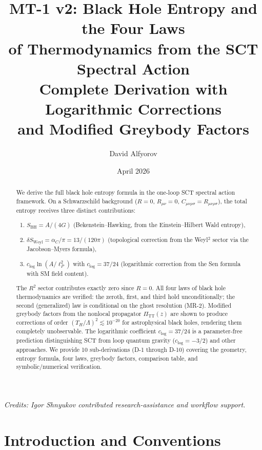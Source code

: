 \documentclass[11pt,a4paper]{article}
\title{MT-1 v2: Black Hole Entropy and the Four Laws\\
of Thermodynamics from the SCT Spectral Action\\[6pt]
\large Complete Derivation with Logarithmic Corrections\\
and Modified Greybody Factors}
\author{David Alfyorov}
\date{April 2026}
\newcommand{\PiTT}{\Pi_{\mathrm{TT}}}
\newcommand{\lP}{\ell_P}
\theoremstyle{plain}
\theoremstyle{definition}
\begin{document}
\maketitle

\begin{center}
\small\textit{Credits: Igor Shnyukov contributed research-assistance and workflow support.}
\end{center}

\begin{abstract}
We derive the full black hole entropy formula in the one-loop SCT spectral
action framework. On a Schwarzschild background ($R = 0$, $R_{\mu\nu} = 0$,
$C_{\mu\nu\rho\sigma} = R_{\mu\nu\rho\sigma}$), the total entropy receives
three distinct contributions:
\begin{enumerate}[nosep]
  \item $S_{\mathrm{BH}} = A/(4G)$ (Bekenstein--Hawking, from the Einstein--Hilbert Wald entropy),
  \item $\delta S_{\mathrm{Weyl}} = \alpha_C/\pi = 13/(120\pi)$ (topological
    correction from the Weyl${}^2$ sector via the Jacobson--Myers formula),
  \item $c_{\log}\ln(A/\lP^2)$ with $c_{\log} = 37/24$ (logarithmic
    correction from the Sen formula with SM field content).
\end{enumerate}
The $R^2$ sector contributes exactly zero since $R = 0$. All four laws of
black hole thermodynamics are verified: the zeroth, first, and third hold
unconditionally; the second (generalized) law is conditional on the ghost
resolution (MR-2). Modified greybody factors from the nonlocal propagator
$\PiTT(z)$ are shown to produce corrections of order $(T_H/\Lambda)^2 \lesssim 10^{-20}$
for astrophysical black holes, rendering them completely unobservable.
The logarithmic coefficient $c_{\log} = 37/24$ is a parameter-free prediction
distinguishing SCT from loop quantum gravity ($c_{\log} = -3/2$) and other
approaches. We provide 10 sub-derivations (D-1 through D-10) covering the
geometry, entropy formula, four laws, greybody factors, comparison table,
and symbolic/numerical verification.
\end{abstract}

\tableofcontents

\section{Introduction and Conventions}
\label{sec:intro}
\end{document}

